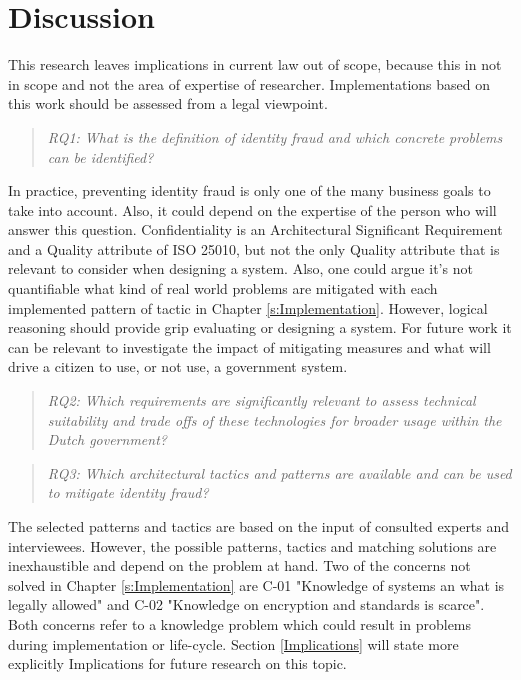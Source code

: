 \chapter{Discussion}\label{s:discussion}
This research leaves implications in current law out of scope, because this in not in scope and not the area of expertise of researcher. Implementations based on this work should be assessed from a legal viewpoint.

\begin{quote}\emph{RQ1: What is the definition of identity fraud and which concrete problems can be identified?}\end{quote} 
In practice, preventing identity fraud is only one of the many business goals to take into account. Also, it could depend on the expertise of the person who will answer this question. Confidentiality is an Architectural Significant Requirement and a Quality attribute of ISO 25010, but not the only Quality attribute that is relevant to consider when designing a system. Also, one could argue it's not quantifiable what kind of real world problems are mitigated with each implemented pattern of tactic in Chapter \ref{s:Implementation}. However, logical reasoning should provide grip evaluating or designing a system. For future work it can be relevant to investigate the impact of mitigating measures and what will drive a citizen to use, or not use, a government system.
\begin{quote}\emph{RQ2: Which requirements are significantly relevant to assess technical suitability and trade offs of these technologies for broader usage within the Dutch government?}\end{quote}

\begin{quote}\emph{RQ3: Which architectural tactics and patterns are available and can be used to mitigate identity fraud?}\end{quote}
The selected patterns and tactics are based on the input of consulted experts and interviewees. However, the possible patterns, tactics and matching solutions are inexhaustible and depend on the problem at hand. Two of the concerns not solved in Chapter \ref{s:Implementation} are C-01 "Knowledge of systems an what is legally allowed" and C-02 "Knowledge on encryption and standards is scarce". Both concerns refer to a knowledge problem which could result in problems during implementation or life-cycle. Section \ref{Implications} will state more explicitly  Implications for future research on this topic.

